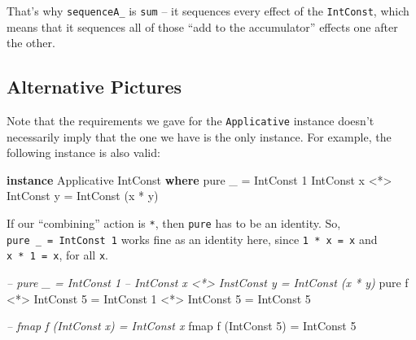\documentclass[]{article}
\newenvironment{Shaded}{}{}
\newcommand{\CommentTok}[1]{\textcolor[rgb]{0.38,0.63,0.69}{\textit{#1}}}
\newcommand{\DataTypeTok}[1]{\textcolor[rgb]{0.56,0.13,0.00}{#1}}
\newcommand{\DecValTok}[1]{\textcolor[rgb]{0.25,0.63,0.44}{#1}}
\newcommand{\FunctionTok}[1]{\textcolor[rgb]{0.02,0.16,0.49}{#1}}
\newcommand{\KeywordTok}[1]{\textcolor[rgb]{0.00,0.44,0.13}{\textbf{#1}}}
\newcommand{\NormalTok}[1]{#1}
\begin{document}
That's why \texttt{sequenceA\_} is \texttt{sum} -- it sequences every effect of
the \texttt{IntConst}, which means that it sequences all of those ``add to the
accumulator'' effects one after the other.

\hypertarget{alternative-pictures}{%
\subsection{Alternative Pictures}\label{alternative-pictures}}

Note that the requirements we gave for the \texttt{Applicative} instance doesn't
necessarily imply that the one we have is the only instance. For example, the
following instance is also valid:

\begin{Shaded}
\begin{Highlighting}[]
\KeywordTok{instance} \DataTypeTok{Applicative} \DataTypeTok{IntConst} \KeywordTok{where}
\NormalTok{    pure _                    }\FunctionTok{=} \DataTypeTok{IntConst} \DecValTok{1}
    \DataTypeTok{IntConst}\NormalTok{ x }\FunctionTok{<*>} \DataTypeTok{IntConst}\NormalTok{ y }\FunctionTok{=} \DataTypeTok{IntConst}\NormalTok{ (x }\FunctionTok{*}\NormalTok{ y)}
\end{Highlighting}
\end{Shaded}

If our ``combining'' action is \texttt{*}, then \texttt{pure} has to be an
identity. So, \texttt{pure\ \_\ =\ IntConst\ 1} works fine as an identity here,
since \texttt{1\ *\ x\ =\ x} and \texttt{x\ *\ 1\ =\ x}, for all \texttt{x}.

\begin{Shaded}
\begin{Highlighting}[]
\CommentTok{-- pure _                     = IntConst 1}
\CommentTok{-- IntConst x <*> InstConst y = IntConst (x * y)}
\NormalTok{pure f }\FunctionTok{<*>} \DataTypeTok{IntConst} \DecValTok{5} \FunctionTok{=} \DataTypeTok{IntConst} \DecValTok{1} \FunctionTok{<*>} \DataTypeTok{IntConst} \DecValTok{5}
                      \FunctionTok{=} \DataTypeTok{IntConst} \DecValTok{5}
\end{Highlighting}
\end{Shaded}

\begin{Shaded}
\begin{Highlighting}[]
\CommentTok{-- fmap f (IntConst x) = IntConst x}
\NormalTok{fmap f (}\DataTypeTok{IntConst} \DecValTok{5}\NormalTok{) }\FunctionTok{=} \DataTypeTok{IntConst} \DecValTok{5}
\end{Highlighting}
\end{Shaded}
\end{document}
